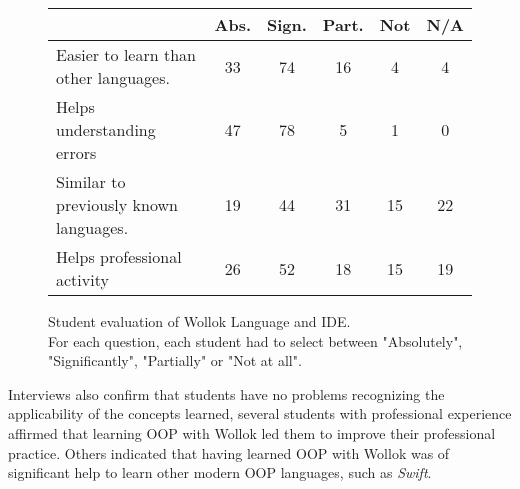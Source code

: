 \begin{figure}[t]
 \centering
 \footnotesize
 \begin{tabular}{|p{16em}|c|c|c|c|c|}
 	\hline
 	& Abs. & Sign. & Part. & Not & N/A \\
 	\hline
 	Easier to learn than other languages. & 33 & 74 & 16 & 4 & 4 \\
 	Helps understanding errors & 47 & 78 & 5 & 1 & 0 \\
 	Similar to previously known languages. & 19 & 44 & 31 & 15 & 22 \\
 	Helps professional activity & 26 & 52 & 18 & 15 & 19 \\
 	\hline
 \end{tabular}

\vspace{-2mm}
\caption{\small Student evaluation of Wollok Language and IDE. \\
\small For each question, each student had to select between "Absolutely", "Significantly", "Partially" or "Not at all".}
\label{fig:surveys/languageAppreciation}
\vspace{-5mm}
\end{figure}

Interviews also confirm that students have no problems recognizing the applicability of the concepts learned,
\eg several students with professional experience affirmed that 
learning OOP with Wollok led them to improve their professional practice.
Others indicated that having learned OOP with Wollok was of significant help 
to learn other modern OOP languages, such as \emph{Swift}.



